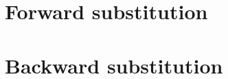 \documentclass[fontsize = 10pt,DIV = 13]{scrartcl}
\begin{document}
\begin{comment}


\subsection{Notation}

This document uses bold symbols for matrices and vectors.
Bold capital letters like $\mathbf{A}$ are used for matrices.
Lower case bold letters are used for vectors ($\mathbf{r}$, $\mathbf{x}$).
The individual elements of a vector are given by:

\begin{align*}
\mathbf{x}
=
\begin{bmatrix}
x_0\\
x_1\\
\vdots\\
x_{N-1}
\end{bmatrix}
\end{align*}

Zero based indexing is used since this makes it easier to translate the equations into C++ code.


The individual components of the matrix $\mathbf{A}$ can be distinguished by a single column specific character and a zero based row index.
The column specific characters start with the character $a$ for the first column and increase alphabetically.
For example, the components of $\mathbf{A}$ with size $3 \times 3$ are:

\begin{align*}
\mathbf{A}
=
\begin{bmatrix}
a_0&b_0&c_0\\
a_1&b_1&c_1\\
a_2&b_2&c_2
\end{bmatrix}
\end{align*}

This element naming is chosen because it can be easier translated into vectorized code than the common double index notation.
\end{comment}

\newpage
\section{Forward substitution}
\label{sec:forwardSubstitution}
\newpage
\section{Backward substitution}
\label{sec:backwardSubstitution}
\end{document}
